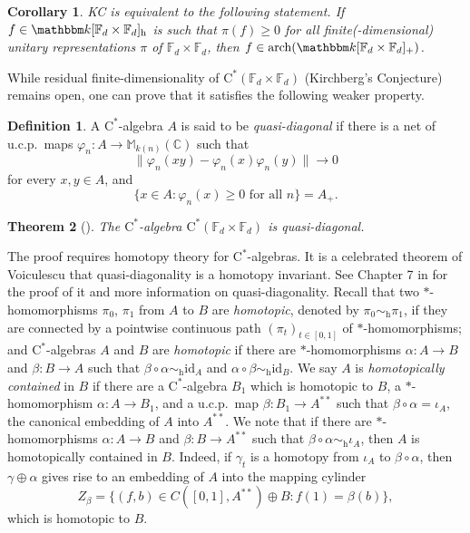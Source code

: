 \documentclass[12pt]{amsart}
\newtheorem{thm}{Theorem}
\newtheorem{cor}[thm]{Corollary}
\theoremstyle{definition}
\newtheorem*{defn}{Definition}
\begin{document}
\begin{cor}
KC is equivalent to the following statement.
If $f\in{{\mathbbm k}}[{{\mathbb F}}_d\times{{\mathbb F}}_d]_{\mathrm{h}}$ is such that $\pi(f)\geq0$ for all
finite(-dimensional) unitary representations $\pi$ of ${{\mathbb F}}_d\times{{\mathbb F}}_d$,
then $f\in\operatorname*{arch}({{\mathbbm k}}[{{\mathbb F}}_d\times{{\mathbb F}}_d]_+)$.
\end{cor}

While residual finite-dimensionality of $\mathrm{C^*}({{\mathbb F}}_d\times{{\mathbb F}}_d)$
(Kirchberg's Conjecture) remains open, one can prove that it satisfies
the following weaker property.

\begin{defn}
A {$\mathrm{C}^*$-alge\-bra\xspace} $A$ is said to be \emph{quasi-diagonal} if
there is a net of u.c.p.\ maps ${\varphi}_n\colon A\to{{\mathbb M}}_{k(n)}({{\mathbb C}})$ such that
\[
\|{\varphi}_n(xy)-{\varphi}_n(x){\varphi}_n(y)\|\to0
\]
for every $x,y\in A$, and
\[
\{ x \in A : {\varphi}_n(x)\geq0 \mbox{ for all }n\}=A_+.
\]
\end{defn}

\begin{thm}[\cite{bo}]\label{thm:qd}
The {$\mathrm{C}^*$-alge\-bra\xspace} $\mathrm{C^*}({{\mathbb F}}_d\times{{\mathbb F}}_d)$ is quasi-diagonal.
\end{thm}

The proof requires homotopy theory for {$\mathrm{C}^*$-alge\-bra\xspace}{}s.
It is a celebrated theorem of Voiculescu that quasi-diagonality
is a homotopy invariant. See Chapter 7 in \cite{bo} for the proof
of it and more information on quasi-diagonality.
Recall that two {$*$-homo\-mor\-phism\xspace}{}s $\pi_0$, $\pi_1$ from $A$ to $B$
are \emph{homotopic}, denoted by $\pi_0\sim_{\mathrm{h}}\pi_1$, if they
are connected by a pointwise continuous path $(\pi_t)_{t\in[0,1]}$
of {$*$-homo\-mor\-phism\xspace}{}s; and {$\mathrm{C}^*$-alge\-bra\xspace}{}s $A$ and $B$ are \emph{homotopic} if
there are {$*$-homo\-mor\-phism\xspace}{}s $\alpha\colon A\to B$ and $\beta\colon B\to A$
such that $\beta\circ\alpha\sim_{\mathrm{h}}{\mathrm{id}}_A$ and
$\alpha\circ\beta\sim_{\mathrm{h}}{\mathrm{id}}_B$.
We say $A$ is \emph{homotopically contained} in $B$ if
there are a {$\mathrm{C}^*$-alge\-bra\xspace} $B_1$ which is homotopic to $B$, a {$*$-homo\-mor\-phism\xspace}{}
$\alpha\colon A\to B_1$, and a u.c.p.\ map $\beta\colon B_1\to A^{**}$
such that $\beta\circ\alpha=\iota_A$, the canonical embedding of $A$ into $A^{**}$.
We note that if there are {$*$-homo\-mor\-phism\xspace}{}s $\alpha\colon A\to B$
and $\beta\colon B\to A^{**}$ such that $\beta\circ\alpha\sim_{\mathrm{h}}\iota_A$,
then $A$ is homotopically contained in $B$.
Indeed, if $\gamma_t$ is a homotopy from $\iota_A$ to $\beta\circ\alpha$, then
$\gamma\oplus\alpha$ gives rise to an embedding of $A$ into the mapping cylinder
\[
Z_\beta=\{ (f,b)\in C([0,1],A^{**})\oplus B : f(1)=\beta(b)\},
\]
which is homotopic to $B$.
\end{document}
